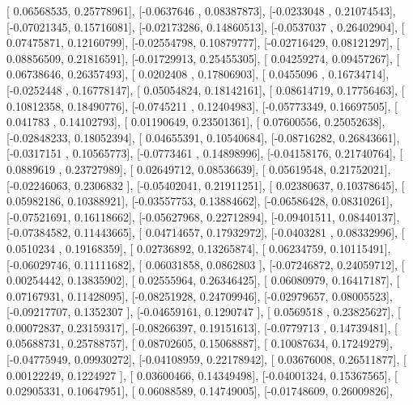 \documentclass{article}
\begin{document}
       [ 0.06568535,  0.25778961],
       [-0.0637646 ,  0.08387873],
       [-0.0233048 ,  0.21074543],
       [-0.07021345,  0.15716081],
       [-0.02173286,  0.14860513],
       [-0.0537037 ,  0.26402904],
       [ 0.07475871,  0.12160799],
       [-0.02554798,  0.10879777],
       [-0.02716429,  0.08121297],
       [ 0.08856509,  0.21816591],
       [-0.01729913,  0.25455305],
       [ 0.04259274,  0.09457267],
       [ 0.06738646,  0.26357493],
       [ 0.0202408 ,  0.17806903],
       [ 0.0455096 ,  0.16734714],
       [-0.0252448 ,  0.16778147],
       [ 0.05054824,  0.18142161],
       [ 0.08614719,  0.17756463],
       [ 0.10812358,  0.18490776],
       [-0.0745211 ,  0.12404983],
       [-0.05773349,  0.16697505],
       [ 0.041783  ,  0.14102793],
       [ 0.01190649,  0.23501361],
       [ 0.07600556,  0.25052638],
       [-0.02848233,  0.18052394],
       [ 0.04655391,  0.10540684],
       [-0.08716282,  0.26843661],
       [-0.0317151 ,  0.10565773],
       [-0.0773461 ,  0.14898996],
       [-0.04158176,  0.21740764],
       [ 0.0889619 ,  0.23727989],
       [ 0.02649712,  0.08536639],
       [ 0.05619548,  0.21752021],
       [-0.02246063,  0.2306832 ],
       [-0.05402041,  0.21911251],
       [ 0.02380637,  0.10378645],
       [ 0.05982186,  0.10388921],
       [-0.03557753,  0.13884662],
       [-0.06586428,  0.08310261],
       [-0.07521691,  0.16118662],
       [-0.05627968,  0.22712894],
       [-0.09401511,  0.08440137],
       [-0.07384582,  0.11443665],
       [ 0.04714657,  0.17932972],
       [-0.0403281 ,  0.08332996],
       [ 0.0510234 ,  0.19168359],
       [ 0.02736892,  0.13265874],
       [ 0.06234759,  0.10115491],
       [-0.06029746,  0.11111682],
       [ 0.06031858,  0.0862803 ],
       [-0.07246872,  0.24059712],
       [ 0.00254442,  0.13835902],
       [ 0.02555964,  0.26346425],
       [ 0.06080979,  0.16417187],
       [ 0.07167931,  0.11428095],
       [-0.08251928,  0.24709946],
       [-0.02979657,  0.08005523],
       [-0.09217707,  0.1352307 ],
       [-0.04659161,  0.1290747 ],
       [ 0.0569518 ,  0.23825627],
       [ 0.00072837,  0.23159317],
       [-0.08266397,  0.19151613],
       [-0.0779713 ,  0.14739481],
       [ 0.05688731,  0.25788757],
       [ 0.08702605,  0.15068887],
       [ 0.10087634,  0.17249279],
       [-0.04775949,  0.09930272],
       [-0.04108959,  0.22178942],
       [ 0.03676008,  0.26511877],
       [ 0.00122249,  0.1224927 ],
       [ 0.03600466,  0.14349498],
       [-0.04001324,  0.15367565],
       [ 0.02905331,  0.10647951],
       [ 0.06088589,  0.14749005],
       [-0.01748609,  0.26009826],
\end{document}

